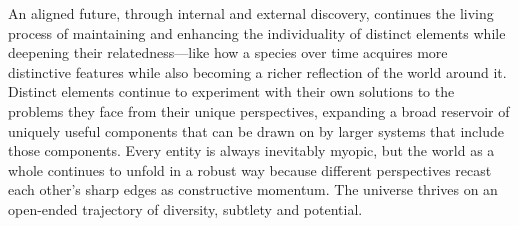 \documentclass[11pt]{article}
\begin{document}
An aligned future, through internal and external discovery, continues the living process of maintaining and enhancing the individuality of distinct elements while deepening their relatedness---like how a species over time acquires more distinctive features while also becoming a richer reflection of the world around it. Distinct elements continue to experiment with their own solutions to the problems they face from their unique perspectives, expanding a broad reservoir of uniquely useful components that can be drawn on by larger systems that include those components. Every entity is always inevitably myopic, but the world as a whole continues to unfold in a robust way because different perspectives recast each other's sharp edges as constructive momentum. The universe thrives on an open-ended trajectory of diversity, subtlety and potential. 










\end{document}
